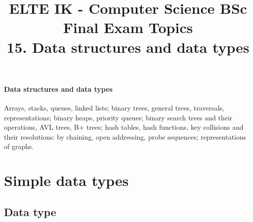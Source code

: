 \documentclass[margin=0px]{article}
\title{\textbf{{\Large ELTE IK - Computer Science BSc} \vspace{0.2cm} \\ {\huge Final Exam Topics}} \vspace{0.3cm} \\ 15. Data structures and data types}
\author{}
\date{}
\newenvironment{tetel}[1]{\paragraph{#1 \\}}{}
\begin{document}
\maketitle

\begin{center}
\end{center}

\begin{tetel}{Data structures and data types}
    Arrays, stacks, queues, linked lists; binary trees, general trees, traversals, representations; binary
heaps, priority queues; binary search trees and their operations, AVL trees, B+ trees; hash tables, hash
functions, key collisions and their resolutions: by chaining, open addressing, probe sequences; representations of graphs.
\end{tetel}

\section{Simple data types}

\subsection{Data type}
\end{document}
